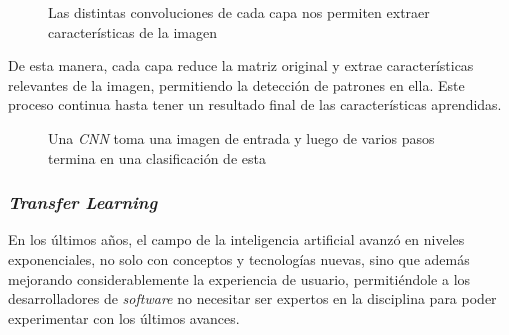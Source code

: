 \documentclass[a4paper]{article}
\begin{document}
\begin{figure}[H]
\caption{Las distintas convoluciones de cada capa nos permiten extraer características de la imagen}
\end{figure}

De esta manera, cada capa reduce la matriz original y extrae características relevantes de la imagen, permitiendo la detección de patrones en ella. Este proceso continua hasta tener un resultado final de las características aprendidas.

\begin{figure}[H]
\caption{Una \textit{CNN} toma una imagen de entrada y luego de varios pasos termina en una clasificación de esta}
\end{figure}

\subsubsection{\textit{Transfer Learning}}

En los últimos años, el campo de la inteligencia artificial avanzó en niveles exponenciales, no solo con conceptos y tecnologías nuevas, sino que además mejorando considerablemente la experiencia de usuario, permitiéndole a los desarrolladores de \textit{software} no necesitar ser expertos en la disciplina para poder experimentar con los últimos avances.
\end{document}
